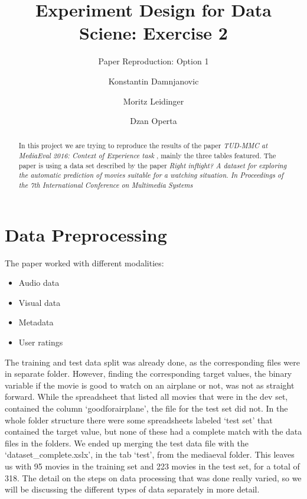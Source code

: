 \documentclass[sigconf]{acmart}
\begin{document}
\title{Experiment Design for Data Sciene: Exercise 2}
\subtitle{Paper Reproduction: Option 1}

\author{Konstantin Damnjanovic}

\author{Moritz Leidinger}

\author{Dzan Operta}


\begin{abstract}
In this project we are trying to reproduce the results of the paper \textit{TUD-MMC at MediaEval 2016: Context of Experience task} \cite{aa}, mainly the three tables featured. The paper is using a data set described by the paper \textit{Right inflight? A dataset for exploring the automatic prediction of movies suitable for a watching situation. In Proceedings of the 7th International Conference on Multimedia Systems} \cite{bb}
\end{abstract}

\maketitle

\section{Data Preprocessing}
The paper worked with different modalities:
\begin{itemize}
\item {Audio data}
\item {Visual data}
\item {Metadata}
\item {User ratings}
\end{itemize}
The training and test data split was already done, as the corresponding files were in separate folder. However, finding the corresponding target values, the binary variable if the movie is good to watch on an airplane or not, was not as straight forward. While the spreadsheet that listed all movies that were in the dev set, contained the column \lq goodforairplane\rq, the file for the test set did not. In the whole folder structure there were some spreadsheets labeled ‘test set’ that contained the target value, but none of these had a complete match with the data files in the folders. We ended up merging the test data file with the \lq dataset\_complete.xslx\rq , in the tab \lq test\rq, from the mediaeval folder. This leaves us with 95 movies in the training set and 223 movies in the test set, for a total of 318. The detail on the steps on data processing that was done really varied, so we will be discussing the different types of data separately in more detail.
\end{document}
